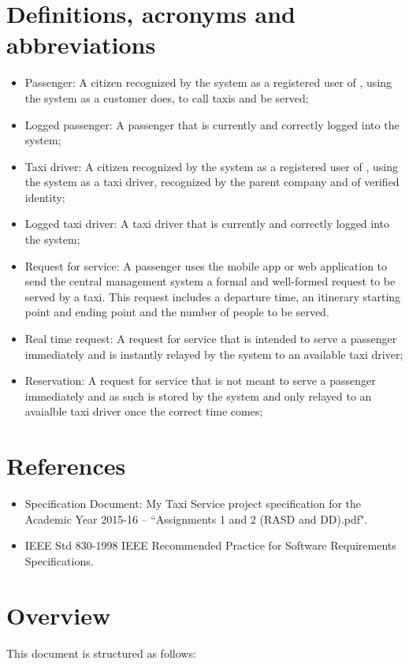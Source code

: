 \section{Definitions, acronyms and abbreviations}
\begin{itemize}

\item Passenger: A citizen recognized by the system as a registered user of \mts{}, using the system as a customer does, to call taxis and be served;
\item Logged passenger: A passenger that is currently and correctly logged into the system;
\item Taxi driver:  A citizen recognized by the system as a registered user of \mts{}, using the system as a taxi driver, recognized by the parent company and of verified identity;
\item Logged taxi driver: A taxi driver that is currently and correctly logged into the system;
\item Request for service: A passenger uses the mobile app or web application to send the central management system a formal and well-formed request to be served by a taxi. This request includes a departure time, an itinerary starting point and ending point and the number of people to be served.
\item Real time request: A request for service that is intended to serve a passenger immediately and is instantly relayed by the system to an available taxi driver;
\item Reservation: A request for service that is not meant to serve a passenger immediately and as such is stored by the system and only relayed to an avaialble taxi driver once the correct time comes;

\end{itemize}


\section{References}
\begin{itemize}

\item Specification Document: My Taxi Service project specification for the Academic Year 2015-16 -- ``Assignments 1 and 2 (RASD and DD).pdf".
\item IEEE Std 830-1998 IEEE Recommended Practice for Software Requirements Specifications.
\end{itemize}


\section{Overview}
This document is structured as follows:

